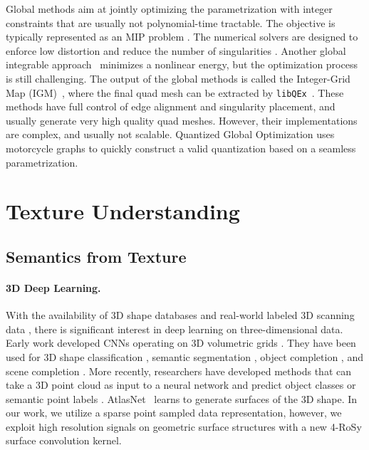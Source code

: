 Global methods aim at jointly optimizing the parametrization with integer constraints that are usually not polynomial-time tractable. The objective is typically represented as an MIP problem \cite{bommes2009mixed}. The numerical solvers are designed to enforce low distortion and reduce the number of singularities \cite{bommes2013integer,myles2013controlled,levi2014strict,myles2014robust}. Another global integrable approach~\cite{diamanti2015integrable} minimizes a nonlinear energy, but the optimization process is still challenging. The output of the global methods is called the Integer-Grid Map (IGM)~\cite{bommes2013integer}, where the final quad mesh can be extracted by \texttt{libQEx}~\cite{ebke2013qex}. These methods have full control of edge alignment and singularity placement, and usually generate very high quality quad meshes. However, their implementations are complex, and usually not scalable. Quantized Global Optimization \cite{Campen2015QGP} uses motorcycle graphs to quickly construct a valid quantization based on a seamless parametrization.

\section{Texture Understanding}
\subsection{Semantics from Texture}
\label{related:texturenet}
\paragraph*{3D Deep Learning.}
With the availability of 3D shape databases \cite{wu20153d,chang2015shapenet,song2017semantic} and real-world labeled 3D scanning data \cite{song2015sun,armeni2017joint,dai2017scannet,chang2017matterport3d}, there is significant interest in deep learning on three-dimensional data.   Early work developed CNNs operating on 3D volumetric grids \cite{wu20153d,maturana2015voxnet}.  They have been used for 3D shape classification  \cite{qi2016volumetric,riegler2017octnet}, semantic  segmentation \cite{dai2017scannet,dai2018scancomplete}, object completion \cite{dai2017shape}, and scene completion \cite{dai2018scancomplete}.   More recently, researchers have developed methods that can take a 3D point cloud as input to a neural network and predict object classes or semantic point labels \cite{qi2017pointnet,qi2017pointnet++,tatarchenko2018tangent,su2018splatnet,atzmon2018point}.  AtlasNet~\cite{groueix2018papier} learns to generate surfaces of the 3D shape.  In our work, we utilize a sparse point sampled data representation, however, we exploit high resolution signals on geometric surface structures with a new 4-RoSy surface convolution kernel.

